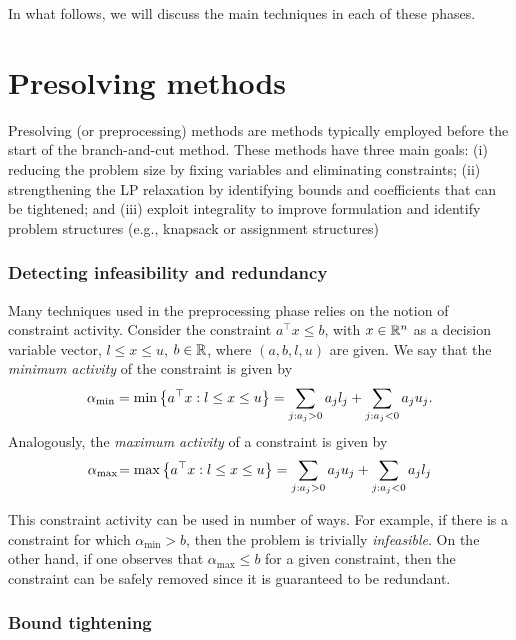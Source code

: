 In what follows, we will discuss the main techniques in each of these phases. 


\section{Presolving methods}

Presolving (or preprocessing) methods are methods typically employed before the start of the branch-and-cut method. These methods have three main goals: (i) reducing the problem size by fixing variables and eliminating constraints; (ii) strengthening the LP relaxation by identifying bounds and coefficients that can be tightened; and (iii) exploit integrality to improve formulation and identify problem structures (e.g., knapsack or assignment structures)


\subsubsection{Detecting infeasibility and redundancy}

Many techniques used in the preprocessing phase relies on the notion of constraint activity. Consider the constraint $a^\top x \leq b$, with $x \in \mathbb{R}^n$ as a decision variable vector, $l \leq x \leq u$, $b \in \mathbb{R}$, where $(a,b,l,u)$ are given. We say that the \emph{minimum activity} of the constraint is given by
%
\begin{equation*}
	\alpha_{\text{min}} = \min\left\{ a^\top x : l \leq x \leq u \right \} = \sum_{j : a_j > 0}a_jl_j + \sum_{j : a_j < 0}a_j u_j.	
\end{equation*}
%
Analogously, the \emph{maximum activity} of a constraint is given by 
%
\begin{equation*}
	\alpha_{\text{max}} \hspace{-2pt} = \max\left\{ a^\top x : l \leq x \leq u \right \} = \sum_{j : a_j > 0}a_ju_j + \sum_{j : a_j < 0}a_jl_j
\end{equation*}

This constraint activity can be used in number of ways. For example, if there is a constraint for which $\alpha_{\text{min}} > b$, then the problem is trivially \emph{infeasible}. On the other hand, if one observes that $\alpha_{\text{max}} \leq b$ for a given constraint, then the constraint can be safely removed since it is guaranteed to be redundant.


\subsubsection{Bound tightening}


